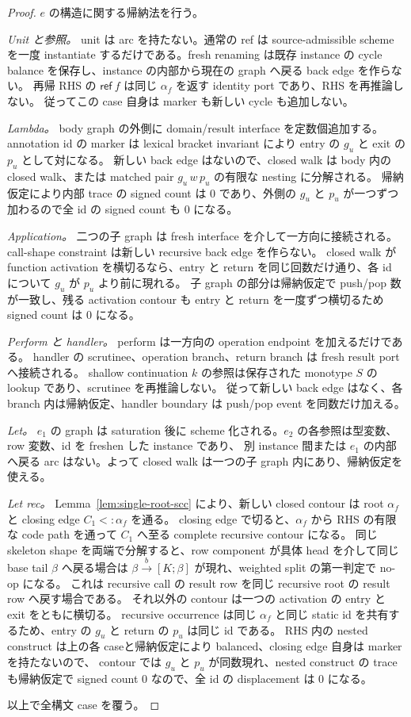 \documentclass[uplatex,dvipdfmx,a4paper,10.5pt]{jsarticle}
\theoremstyle{jpplain}
\newcommand{\kw}[1]{\mathsf{#1}}
\newcommand{\epedge}[4]{#1\xrightarrow{#2}[#3;#4]}
\begin{document}
\begin{proof}
$e$ の構造に関する帰納法を行う。

\emph{Unit と参照。}
unit は arc を持たない。通常の ref は source-admissible scheme を一度 instantiate するだけである。fresh renaming は既存 instance の cycle balance を保存し、instance の内部から現在の graph へ戻る back edge を作らない。
再帰 RHS の $\kw{ref}\ f$ は同じ $\alpha_f$ を返す identity port であり、RHS を再推論しない。
従ってこの case 自身は marker も新しい cycle も追加しない。

\emph{Lambda。}
body graph の外側に domain/result interface を定数個追加する。
annotation id の marker は lexical bracket invariant により entry の $g_u$ と exit の $p_u$ として対になる。
新しい back edge はないので、closed walk は body 内の closed walk、または matched pair $g_u\,w\,p_u$ の有限な nesting に分解される。
帰納仮定により内部 trace の signed count は 0 であり、外側の $g_u$ と $p_u$ が一つずつ加わるので全 id の signed count も 0 になる。

\emph{Application。}
二つの子 graph は fresh interface を介して一方向に接続される。
call-shape constraint は新しい recursive back edge を作らない。
closed walk が function activation を横切るなら、entry と return を同じ回数だけ通り、各 id について $g_u$ が $p_u$ より前に現れる。
子 graph の部分は帰納仮定で push/pop 数が一致し、残る activation contour も entry と return を一度ずつ横切るため signed count は 0 になる。

\emph{Perform と handler。}
perform は一方向の operation endpoint を加えるだけである。
handler の scrutinee、operation branch、return branch は fresh result port へ接続される。
shallow continuation $k$ の参照は保存された monotype $S$ の lookup であり、scrutinee を再推論しない。
従って新しい back edge はなく、各 branch 内は帰納仮定、handler boundary は push/pop event を同数だけ加える。

\emph{Let。}
$e_1$ の graph は saturation 後に scheme 化される。$e_2$ の各参照は型変数、row 変数、id を freshen した instance であり、
別 instance 間または $e_1$ の内部へ戻る arc はない。よって closed walk は一つの子 graph 内にあり、帰納仮定を使える。

\emph{Let rec。}
Lemma~\ref{lem:single-root-scc} により、新しい closed contour は root $\alpha_f$ と closing edge $C_1<:\alpha_f$ を通る。
closing edge で切ると、$\alpha_f$ から RHS の有限な code path を通って $C_1$ へ至る complete recursive contour になる。
同じ skeleton shape を両端で分解すると、row component が具体 head を介して同じ base tail $\beta$ へ戻る場合は
$\epedge{\beta}{b}{K}{\beta}$ が現れ、weighted split の第一判定で no-op になる。
これは recursive call の result row を同じ recursive root の result row へ戻す場合である。
それ以外の contour は一つの activation の entry と exit をともに横切る。
recursive occurrence は同じ $\alpha_f$ と同じ static id を共有するため、entry の $g_u$ と return の $p_u$ は同じ id である。
RHS 内の nested construct は上の各 caseと帰納仮定により balanced、closing edge 自身は marker を持たないので、
contour では $g_u$ と $p_u$ が同数現れ、nested construct の trace も帰納仮定で signed count 0 なので、全 id の displacement は 0 になる。

以上で全構文 case を覆う。
\end{proof}
\end{document}
